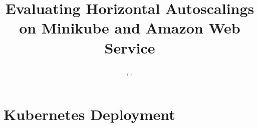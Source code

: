 \documentclass[journal]{IEEEtran}
\begin{document}


\title{Evaluating Horizontal Autoscalings on Minikube and Amazon Web Service }

\author{
  \authorOne,
  \authorTwo,
  \authorThree
}



\maketitle











\appendices
\section{Kubernetes Deployment} \label{appendix:php_apache}


\end{document}
